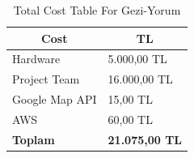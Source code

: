 \begin{table}[]
\centering
\caption{Total Cost Table For Gezi-Yorum}
\label{my-label}
\begin{tabular}{|l|l|}
\hline
\multicolumn{1}{|c|}{\textbf{Cost}} & \multicolumn{1}{c|}{\textbf{TL}} \\ \hline
Hardware                               & 5.000,00 TL                      \\ \hline
Project Team                           & 16.000,00 TL                      \\ \hline
Google Map API                         & 15,00 TL                      \\ \hline
AWS                                 & 60,00 TL                      \\ \hline
\textbf{Toplam}                        & \textbf{21.075,00 TL}            \\ \hline
\end{tabular}
\end{table}




